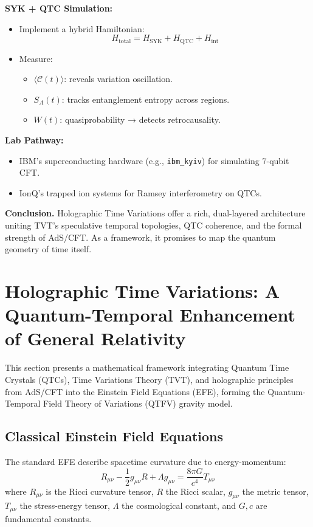 \documentclass{article}
\theoremstyle{plain}
\theoremstyle{claimstyle}
\begin{document}
\textbf{SYK + QTC Simulation:}
\begin{itemize}
    \item Implement a hybrid Hamiltonian:
    \begin{equation}
    H_{\text{total}} = H_{\text{SYK}} + H_{\text{QTC}} + H_{\text{int}}
    \end{equation}
    \item Measure:
    \begin{itemize}
        \item \( \langle \mathcal{C}(t) \rangle \): reveals variation oscillation.
        \item \( S_A(t) \): tracks entanglement entropy across regions.
        \item \( W(t) \): quasiprobability → detects retrocausality.
    \end{itemize}
\end{itemize}

\textbf{Lab Pathway:}
\begin{itemize}
    \item IBM's superconducting hardware (e.g., \texttt{ibm\_kyiv}) for simulating 7-qubit CFT.
    \item IonQ's trapped ion systems for Ramsey interferometry on QTCs.
\end{itemize}

\textbf{Conclusion.} Holographic Time Variations offer a rich, dual-layered architecture uniting TVT's speculative temporal topologies, QTC coherence, and the formal strength of AdS/CFT. As a framework, it promises to map the quantum geometry of time itself.

\section{Holographic Time Variations: A Quantum-Temporal Enhancement of General Relativity}

This section presents a mathematical framework integrating Quantum Time Crystals (QTCs), Time Variations Theory (TVT), and holographic principles from AdS/CFT into the Einstein Field Equations (EFE), forming the Quantum-Temporal Field Theory of Variations (QTFV) gravity model.

\subsection{Classical Einstein Field Equations}
The standard EFE describe spacetime curvature due to energy-momentum:
\begin{equation}
R_{\mu\nu} - \frac{1}{2} g_{\mu\nu} R + \Lambda g_{\mu\nu} = \frac{8\pi G}{c^4} T_{\mu\nu}
\end{equation}
where \( R_{\mu\nu} \) is the Ricci curvature tensor, \( R \) the Ricci scalar, \( g_{\mu\nu} \) the metric tensor, \( T_{\mu\nu} \) the stress-energy tensor, \( \Lambda \) the cosmological constant, and \( G, c \) are fundamental constants.
\end{document}
